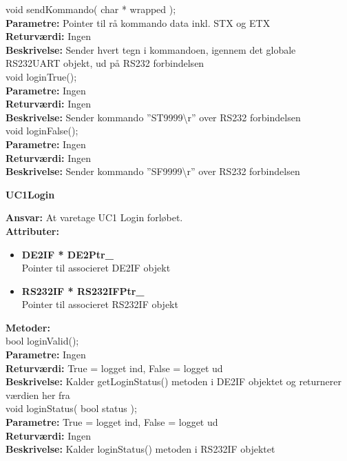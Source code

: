 void sendKommando( char * wrapped ); \\
\textbf{Parametre:} Pointer til rå kommando data inkl. STX og ETX \\
\textbf{Returværdi:} Ingen \\
\textbf{Beskrivelse:} Sender hvert tegn i kommandoen, igennem det globale RS232UART objekt, ud på RS232 forbindelsen\\

void loginTrue(); \\
\textbf{Parametre:} Ingen \\
\textbf{Returværdi:} Ingen \\
\textbf{Beskrivelse:} Sender kommando ''ST9999\textbackslash r'' over RS232 forbindelsen\\

void loginFalse(); \\
\textbf{Parametre:} Ingen \\
\textbf{Returværdi:} Ingen \\
\textbf{Beskrivelse:} Sender kommando ''SF9999\textbackslash r'' over RS232 forbindelsen\\

%
%
{\centering
\textbf{UC1Login}\par
}
\textbf{Ansvar:} At varetage UC1 Login forløbet. \\
\textbf{Attributer:}
\begin{itemize}
	\item \textbf{DE2IF * DE2Ptr\_} \\
	Pointer til associeret DE2IF objekt
	\item \textbf{RS232IF * RS232IFPtr\_} \\
	Pointer til associeret RS232IF objekt
\end{itemize}
\textbf{Metoder:} \\
bool loginValid(); \\
\textbf{Parametre:} Ingen \\
\textbf{Returværdi:} True = logget ind, False = logget ud \\
\textbf{Beskrivelse:} Kalder getLoginStatus() metoden i DE2IF objektet og returnerer værdien her fra \\

void loginStatus( bool status ); \\
\textbf{Parametre:} True = logget ind, False = logget ud \\
\textbf{Returværdi:} Ingen \\
\textbf{Beskrivelse:} Kalder loginStatus() metoden i RS232IF objektet \\

